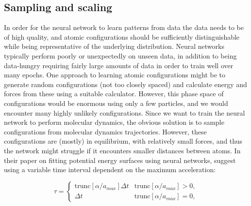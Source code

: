 \subsection{Sampling and scaling}
In order for the neural network to learn patterns from data
the data needs to be of high quality, and atomic configurations
should be sufficiently distinguishable while being representative
of the underlying distribution. Neural networks typically perform
poorly or unexpectedly on unseen data, in addition to being data-hungry
requiring fairly large amounts of data in order to train well
over many epochs.
One approach to learning atomic configurations might be to generate
random configurations (not too closely spaced) and calculate energy
and forces from these using a suitable calculator. However, this
phase space of configurations would be enormous using only a few particles,
and we would encounter many highly unlikely configurations.
Since we want to train the neural network to perform molecular dynamics,
the obvious solution is to sample configurations from molecular dynamics
trajectories. However, these configurations are (mostly) in equilibrium, with
relatively small forces, and thus the network might struggle if
it encounters smaller distances between atoms.
In their paper on fitting potential energy surfaces using neural networks,
\parencite[Pukrittayakamee et al.]{pukrittayakamee2009simultaneous}
suggest using a variable time interval dependent on the maximum acceleration:

\begin{equation}
    \tau = 
    \begin{cases}
        \text{trunc}[\alpha / a_{max}]\Delta t & \text{trunc}
        [\alpha / a_{max}] > 0, \\
        \Delta t & \text{trunc}
        [\alpha / a_{max}] = 0,
    \end{cases}
\end{equation}

